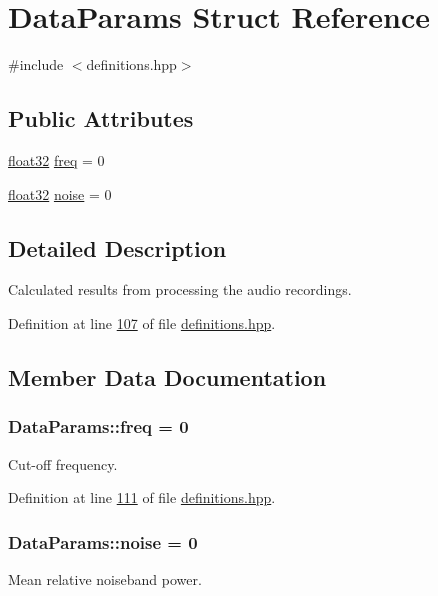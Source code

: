 \hypertarget{structDataParams}{\section{Data\+Params Struct Reference}
\label{structDataParams}
}


{\ttfamily \#include $<$definitions.\+hpp$>$}

\subsection*{Public Attributes}
\begin{DoxyCompactItemize}
\item 
\hyperlink{definitions_8hpp_aacdc525d6f7bddb3ae95d5c311bd06a1}{float32} \hyperlink{structDataParams_a12566e017407647bc8287d62554ad3fb}{freq} = 0
\item 
\hyperlink{definitions_8hpp_aacdc525d6f7bddb3ae95d5c311bd06a1}{float32} \hyperlink{structDataParams_a4efd1d2231c6fa7c878c9d5e1650738f}{noise} = 0
\end{DoxyCompactItemize}


\subsection{Detailed Description}
Calculated results from processing the audio recordings. 

Definition at line \hyperlink{definitions_8hpp_source_l00107}{107} of file \hyperlink{definitions_8hpp_source}{definitions.\+hpp}.



\subsection{Member Data Documentation}
\hypertarget{structDataParams_a12566e017407647bc8287d62554ad3fb}{
\subsubsection[{freq}]{ Data\+Params\+::freq = 0}}\label{structDataParams_a12566e017407647bc8287d62554ad3fb}
Cut-\/off frequency. 

Definition at line \hyperlink{definitions_8hpp_source_l00111}{111} of file \hyperlink{definitions_8hpp_source}{definitions.\+hpp}.

\hypertarget{structDataParams_a4efd1d2231c6fa7c878c9d5e1650738f}{
\subsubsection[{noise}]{ Data\+Params\+::noise = 0}}\label{structDataParams_a4efd1d2231c6fa7c878c9d5e1650738f}
Mean relative noiseband power. 

